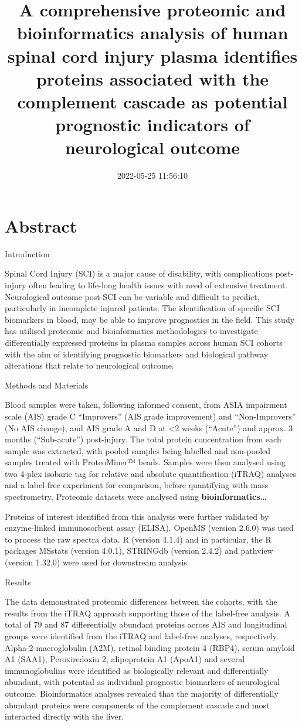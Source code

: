 \documentclass[9pt,lineno]{elife}
\title{A comprehensive proteomic and bioinformatics analysis of human spinal cord injury plasma identifies proteins associated with the complement cascade as potential prognostic indicators of neurological outcome}
\author{}
\date{2022-05-25 11:56:10}
\begin{document}
\maketitle

\hypertarget{abstract}{%
\section{Abstract}\label{abstract}}

Introduction

Spinal Cord Injury (SCI) is a major cause of disability, with complications post-injury often leading to life-long health issues with need of extensive treatment. Neurological outcome post-SCI can be variable and difficult to predict, particularly in incomplete injured patients. The identification of specific SCI biomarkers in blood, may be able to improve prognostics in the field. This study has utilised proteomic and bioinformatics methodologies to investigate differentially expressed proteins in plasma samples across human SCI cohorts with the aim of identifying prognostic biomarkers and biological pathway alterations that relate to neurological outcome.

Methods and Materials

Blood samples were taken, following informed consent, from ASIA impairment scale (AIS) grade C ``Improvers'' (AIS grade improvement) and ``Non-Improvers'' (No AIS change), and AIS grade A and D at \textless2 weeks (``Acute'') and approx. 3 months (``Sub-acute'') post-injury. The total protein concentration from each sample was extracted, with pooled samples being labelled and non-pooled samples treated with ProteoMiner™ beads. Samples were then analysed using two 4-plex isobaric tag for relative and absolute quantification (iTRAQ) analyses and a label-free experiment for comparison, before quantifying with mass spectrometry. Proteomic datasets were analysed using \textbf{bioinformatics\ldots{}}

Proteins of interest identified from this analysis were further validated by enzyme-linked immunosorbent assay (ELISA).
OpenMS (version 2.6.0) was used to process the raw spectra data.
R (version 4.1.4) and in particular, the R packages MSstats (version 4.0.1), STRINGdb (version 2.4.2) and pathview (version 1.32.0) were used for downstream analysis.

Results

The data demonstrated proteomic differences between the cohorts, with the results from the iTRAQ approach supporting those of the label-free analysis. A total of 79 and 87 differentially abundant proteins across AIS and longitudinal groups were identified from the iTRAQ and label-free analyses, respectively. Alpha-2-macroglobulin (A2M), retinol binding protein 4 (RBP4), serum amyloid A1 (SAA1), Peroxiredoxin 2, alipoprotein A1 (ApoA1) and several immunoglobulins were identified as biologically relevant and differentially abundant, with potential as individual prognostic biomarkers of neurological outcome. Bioinformatics analyses revealed that the majority of differentially abundant proteins were components of the complement cascade and most interacted directly with the liver.
\end{document}
